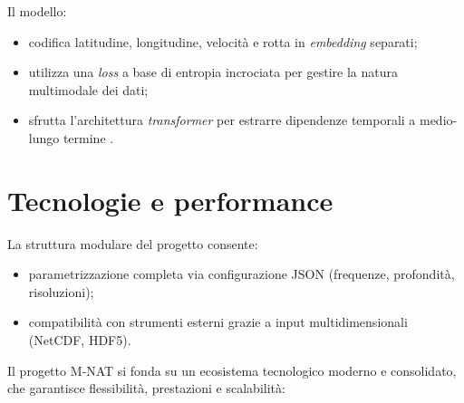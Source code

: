 \noindent Il modello:
\begin{itemize}
  \item codifica latitudine, longitudine, velocità e rotta in \textit{embedding} separati;
  \item utilizza una \textit{loss} a base di entropia incrociata per gestire la natura multimodale dei dati;
  \item sfrutta l'architettura \textit{transformer} per estrarre dipendenze temporali a medio-lungo termine \cite{nguyen2021traisformer}.
\end{itemize}

\section{Tecnologie e performance}

La struttura modulare del progetto consente:
\begin{itemize}
  \item parametrizzazione completa via configurazione JSON (frequenze, profondità, risoluzioni);
  \item compatibilità con strumenti esterni grazie a input multidimensionali (NetCDF, HDF5).
\end{itemize}

Il progetto M‑NAT si fonda su un ecosistema tecnologico moderno e consolidato, che garantisce flessibilità, prestazioni e scalabilità:

